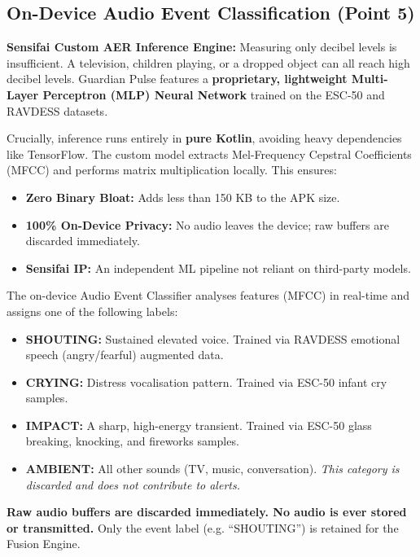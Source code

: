 \documentclass[12pt,a4paper]{article}
\begin{document}
\subsection{On-Device Audio Event Classification (Point 5)}
\begin{highlightbox}
\textbf{Sensifai Custom AER Inference Engine:} Measuring only decibel levels is insufficient. A television, children playing, or a dropped object can all reach high decibel levels. Guardian Pulse features a \textbf{proprietary, lightweight Multi-Layer Perceptron (MLP) Neural Network} trained on the ESC-50 and RAVDESS datasets.

Crucially, inference runs entirely in \textbf{pure Kotlin}, avoiding heavy dependencies like TensorFlow. The custom model extracts Mel-Frequency Cepstral Coefficients (MFCC) and performs matrix multiplication locally. This ensures:
\begin{itemize}[leftmargin=*, label=\textcolor{secondary}{\textbullet}]
    \item \textbf{Zero Binary Bloat:} Adds less than 150 KB to the APK size.
    \item \textbf{100\% On-Device Privacy:} No audio leaves the device; raw buffers are discarded immediately.
    \item \textbf{Sensifai IP:} An independent ML pipeline not reliant on third-party models.
\end{itemize}
\end{highlightbox}

\vspace{0.3cm}
The on-device Audio Event Classifier analyses features (MFCC) in real-time and assigns one of the following labels:
\begin{itemize}[leftmargin=*, label=\textcolor{secondary}{\textbullet}]
    \item \textbf{SHOUTING:} Sustained elevated voice. Trained via RAVDESS emotional speech (angry/fearful) augmented data.
    \item \textbf{CRYING:} Distress vocalisation pattern. Trained via ESC-50 infant cry samples.
    \item \textbf{IMPACT:} A sharp, high-energy transient. Trained via ESC-50 glass breaking, knocking, and fireworks samples.
    \item \textbf{AMBIENT:} All other sounds (TV, music, conversation). \textit{This category is discarded and does not contribute to alerts.}
\end{itemize}
\textbf{Raw audio buffers are discarded immediately. No audio is ever stored or transmitted.} Only the event label (e.g. ``SHOUTING'') is retained for the Fusion Engine.
\end{document}
